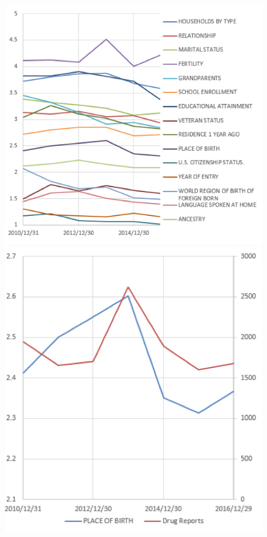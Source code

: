 \documentclass[11pt]{article}
\begin{document}
\begin{figure}[H]
	\centering %
	\begin{minipage}[b]{0.48\textwidth} %
		\centering %
		\includegraphics[scale=0.8]{./figures/9.png} %
		\caption{}
		\label{Fig9}
	\end{minipage}
	\begin{minipage}[b]{0.48\textwidth} %
		\centering %
		\includegraphics[scale=0.8]{./figures/10.png}%
		\caption{}
		\label{Fig10}
	\end{minipage}
\end{figure}
\end{document}
